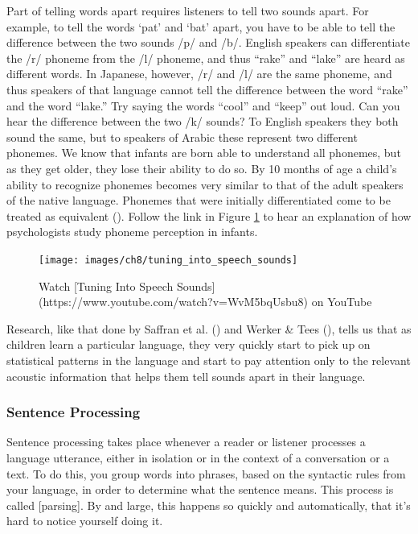 \documentclass[
]{krantz}
\begin{document}
Part of telling words apart requires listeners to tell two sounds apart. For example, to tell the words `pat' and `bat' apart, you have to be able to tell the difference between the two sounds /p/ and /b/. English speakers can differentiate the /r/ phoneme from the /l/ phoneme, and thus ``rake'' and ``lake'' are heard as different words. In Japanese, however, /r/ and /l/ are the same phoneme, and thus speakers of that language cannot tell the difference between the word ``rake'' and the word ``lake.'' Try saying the words ``cool'' and ``keep'' out loud. Can you hear the difference between the two /k/ sounds? To English speakers they both sound the same, but to speakers of Arabic these represent two different phonemes. We know that infants are born able to understand all phonemes, but as they get older, they lose their ability to do so. By 10 months of age a child's ability to recognize phonemes becomes very similar to that of the adult speakers of the native language. Phonemes that were initially differentiated come to be treated as equivalent (). Follow the link in Figure \ref{fig:speechsounds} to hear an explanation of how psychologists study phoneme perception in infants.

\begin{figure}

{\centering \texttt{[image: images/ch8/tuning\_into\_speech\_sounds]} 

}

\caption{Watch [Tuning Into Speech Sounds](https://www.youtube.com/watch?v=WvM5bqUsbu8) on YouTube}\label{fig:speechsounds}
\end{figure}

Research, like that done by Saffran et al. () and Werker \& Tees (), tells us that as children learn a particular language, they very quickly start to pick up on statistical patterns in the language and start to pay attention only to the relevant acoustic information that helps them tell sounds apart in their language.

\subsubsection*{Sentence Processing}\label{sentence-processing}


Sentence processing takes place whenever a reader or listener processes a language utterance, either in isolation or in the context of a conversation or a text. To do this, you group words into phrases, based on the syntactic rules from your language, in order to determine what the sentence means. This process is called {[}parsing{]}. By and large, this happens so quickly and automatically, that it's hard to notice yourself doing it.
\end{document}
